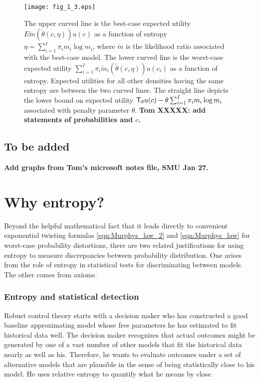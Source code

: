 \begin{figure}[htp]
\centering
\texttt{[image: fig\_1\_3.eps]}
\caption[Multiple expected utilities]{The upper curved line is the best-case expected utility
$E \check m(\check \theta(c,\eta)) u (c) $ as a function of entropy $\eta = \sum_{i=1}^I \pi_i m_i \log m_i$,  where $\check m$
 is the likelihood ratio associated with the
best-case model. The lower curved line is the worst-case expected utility $\sum_{i=1}^I \pi_i \tilde m_i (\tilde \theta(c,\eta)) u(c_i)$ as a function of entropy.
 Expected utilities for all other densities having the same entropy are between the two curved lines.
The  straight line depicts the lower bound on expected utility  ${\sf T}_\theta u(c) - \theta \sum_{i=1}^I \pi_i m_i \log m_i$ associated
with penalty parameter $\theta$. \textbf{Tom XXXXX: add statements of probabilities and $c$.}}
\label{fig1_num5}
\end{figure}


\subsection{To be added}

\textbf{Add graphs from Tom's microsoft notes file, SMU Jan 27.}




\section{Why entropy?}
Beyond the helpful mathematical fact that it leads directly to convenient exponential twisting formulas
\eqref{eqn:Murphys_law_2} and \eqref{eqn:Murphys_law} for worst-case probability distortions,
there are two related justifications for using entropy to measure discrepancies between probability distribution.
One arises from the role of entropy in statistical tests for discriminating between models. The other comes from axioms.

\subsubsection{Entropy and statistical detection}

Robust control theory starts with a decision maker  who  has constructed a good baseline approximating model
 whose free parameters he has  estimated  to fit historical data well.  The decision maker recognizes that actual outcomes might be  generated
by one of a vast number of  other  models that fit the historical data  nearly as well as his.  Therefore, he wants to evaluate outcomes
under a set of alternative models that are  plausible in the sense of
 being statistically close to his model. He uses relative entropy to quantify what he means by
close.


